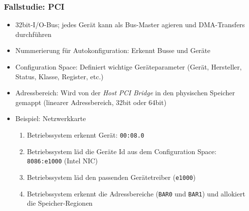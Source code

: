 \subsubsection{Fallstudie: PCI}
\begin{itemize}
	\item 32bit-I/O-Bus; jedes Gerät kann als Bus-Master agieren und DMA-Transfers durchführen
	\item Nummerierung für Autokonfiguration: Erkennt Busse und Geräte
	\item Configuration Space: Definiert wichtige Geräteparameter (Gerät, Hersteller, Status, Klasse, Register, etc.)
	\item Adressbereich: Wird von der \textit{Host PCI Bridge} in den physischen Speicher gemappt (linearer Adressbereich, 32bit oder 64bit)
	\item Beispiel: Netzwerkkarte
	\begin{enumerate}
		\item Betriebssystem erkennt Gerät: \texttt{00:08.0}
		\item Betriebssystem läd die Geräte Id aus dem Configuration Space: \texttt{8086:e1000} (Intel NIC)
		\item Betriebssystem läd den passenden Gerätetreiber (\texttt{e1000})
		\item Betriebssystem erkennt die Adressbereiche (\texttt{BAR0} und \texttt{BAR1}) und allokiert die Speicher-Regionen
	\end{enumerate}
\end{itemize}

